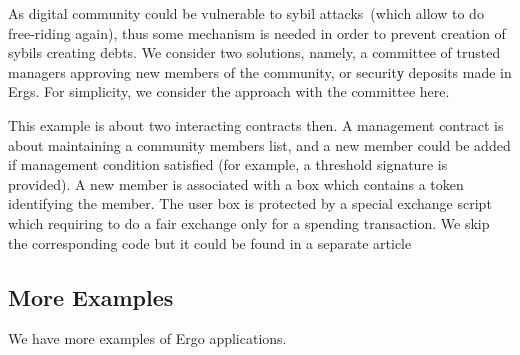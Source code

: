  As digital community could be vulnerable to sybil attacks~(which allow to do free-riding again), thus some mechanism
 is needed in order to prevent creation of sybils creating debts. We consider two solutions, namely, a committee of
 trusted managers approving new members of the community, or securitу deposits made in Ergs. For simplicity, we
 consider the approach with the committee here.

 This example is about two interacting contracts then. A management contract is about maintaining a
 community members list, and a new member could be added if management condition satisfied  (for example, a threshold
 signature is provided). A new member is associated with a box which contains a token identifying the member. The user
 box is protected by a special exchange script which requiring to do a fair exchange only for a spending transaction.
 We skip the corresponding code but it could be found in a separate article 

\subsection{More Examples}

 We have more examples of Ergo applications.

